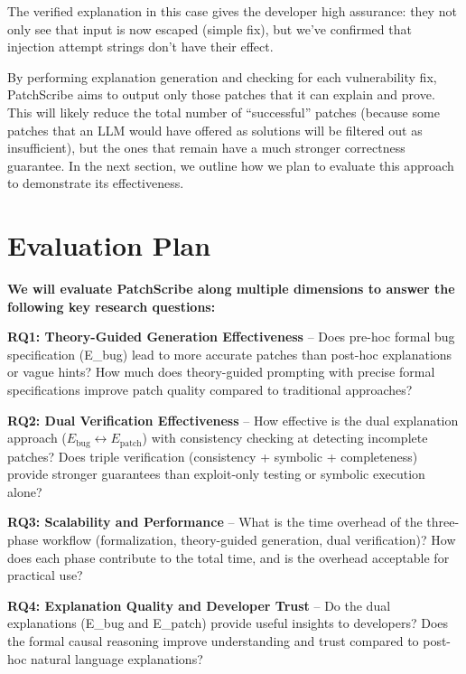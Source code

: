 \documentclass[conference,compsoc]{IEEEtran}
\begin{document}
The verified explanation in this case gives the developer high
assurance: they not only see that input is now escaped (simple fix), but
we've confirmed that injection attempt strings don't have their effect.

By performing explanation generation and checking for each vulnerability
fix, PatchScribe aims to output only those patches that it can explain
and prove. This will likely reduce the total number of ``successful''
patches (because some patches that an LLM would have offered as
solutions will be filtered out as insufficient), but the ones that
remain have a much stronger correctness guarantee. In the next section,
we outline how we plan to evaluate this approach to demonstrate its
effectiveness.

\section{Evaluation Plan}\label{evaluation-plan}

\textbf{We will evaluate PatchScribe along multiple dimensions to answer
the following key research questions:}

\textbf{RQ1: Theory-Guided Generation Effectiveness} -- Does pre-hoc
formal bug specification (E\_bug) lead to more accurate patches than
post-hoc explanations or vague hints? How much does theory-guided
prompting with precise formal specifications improve patch quality
compared to traditional approaches?

\textbf{RQ2: Dual Verification Effectiveness} -- How effective is the
dual explanation approach ($E_{\text{bug}} \leftrightarrow E_{\text{patch}}$) with consistency checking
at detecting incomplete patches? Does triple verification (consistency +
symbolic + completeness) provide stronger guarantees than exploit-only
testing or symbolic execution alone?

\textbf{RQ3: Scalability and Performance} -- What is the time overhead
of the three-phase workflow (formalization, theory-guided generation,
dual verification)? How does each phase contribute to the total time,
and is the overhead acceptable for practical use?

\textbf{RQ4: Explanation Quality and Developer Trust} -- Do the dual
explanations (E\_bug and E\_patch) provide useful insights to
developers? Does the formal causal reasoning improve understanding and
trust compared to post-hoc natural language explanations?
\end{document}
